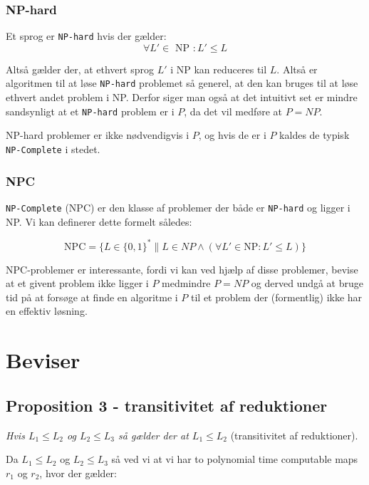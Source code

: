 \documentclass[danish,a4paper,article,12pt]{article}
\begin{document}
\subsubsection{NP-hard}
Et sprog er \texttt{NP-hard} hvis der gælder:
\begin{equation}
\forall L' \in \text{ NP } : L' \leq L
\end{equation}

Altså gælder der, at ethvert sprog $L'$ i NP kan reduceres til $L$. Altså er algoritmen til at løse \texttt{NP-hard} problemet så generel, at den kan bruges til at løse ethvert andet problem i NP. Derfor siger man også at det intuitivt set er mindre sandsynligt at et \texttt{NP-hard} problem er i $P$, da det vil medføre at $P=NP$.

NP-hard problemer er ikke nødvendigvis i $P$, og hvis de er i $P$ kaldes de typisk \texttt{NP-Complete} i stedet.

\subsubsection{NPC}
\texttt{NP-Complete} (NPC) er den klasse af problemer der både er \texttt{NP-hard} og ligger i NP. Vi kan definerer dette formelt således:

\begin{equation}
\text{NPC}=\{ L\in \{0,1\}^* \| L\in NP \wedge (\forall L' \in \text{NP} : L' \leq L) \}
\end{equation}

NPC-problemer er interessante, fordi vi kan ved hjælp af disse problemer, bevise at et givent problem ikke ligger i $P$ medmindre $P=NP$ og derved undgå at bruge tid på at forsøge at finde en algoritme i $P$ til et problem der (formentlig) ikke har en effektiv løsning.

\section{Beviser}

\subsection{Proposition 3 - transitivitet af reduktioner}
\emph{Hvis $L_1 \leq L_2$ og $L_2 \leq L_3$ så gælder der at $L_1 \leq L_2$} (transitivitet af reduktioner).

Da $L_1 \leq L_2$ og $L_2 \leq L_3$ så ved vi at vi har to polynomial time computable maps $r_1$ og $r_2$, hvor der gælder:
\end{document}
